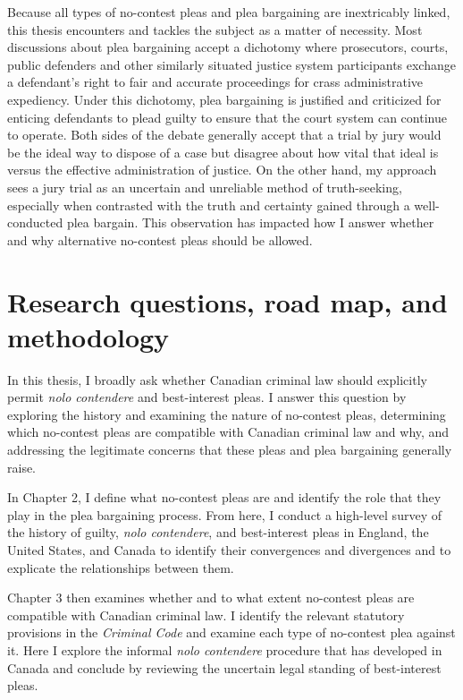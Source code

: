 Because all types of no-contest pleas and plea bargaining are inextricably linked, this thesis encounters and tackles the subject as a matter of necessity. Most discussions about plea bargaining accept a dichotomy where prosecutors, courts, public defenders and other similarly situated justice system participants exchange a defendant's right to fair and accurate proceedings for crass administrative expediency. Under this dichotomy, plea bargaining is justified and criticized for enticing defendants to plead guilty to ensure that the court system can continue to operate. Both sides of the debate generally accept that a trial by jury would be the ideal way to dispose of a case but disagree about how vital that ideal is versus the effective administration of justice. On the other hand, my approach sees a jury trial as an uncertain and unreliable method of truth-seeking, especially when contrasted with the truth and certainty gained through a well-conducted plea bargain. This observation has impacted how I answer whether and why alternative no-contest pleas should be allowed.

\section{Research questions, road map, and methodology}

In this thesis, I broadly ask whether Canadian criminal law should explicitly permit \textit{nolo contendere} and best-interest pleas. I answer this question by exploring the history and examining the nature of no-contest pleas, determining which no-contest pleas are compatible with Canadian criminal law and why, and addressing the legitimate concerns that these pleas and plea bargaining generally raise.

In Chapter 2, I define what no-contest pleas are and identify the role that they play in the plea bargaining process. From here, I conduct a high-level survey of the history of guilty, \textit{nolo contendere}, and best-interest pleas in England, the United States, and Canada to identify their convergences and divergences and to explicate the relationships between them. 

Chapter 3 then examines whether and to what extent no-contest pleas are compatible with Canadian criminal law. I identify the relevant statutory provisions in the \textit{Criminal Code} and examine each type of no-contest plea against it. Here I explore the informal \textit{nolo contendere} procedure that has developed in Canada and conclude by reviewing the uncertain legal standing of best-interest pleas.

